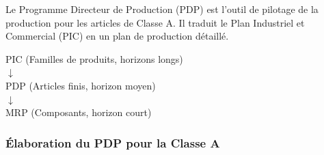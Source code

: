 \documentclass{article}
\begin{document}
Le Programme Directeur de Production (PDP) est l'outil de pilotage de la production pour les articles de Classe A. Il traduit le Plan Industriel et Commercial (PIC) en un plan de production détaillé.

\begin{tcolorbox}[colback=blue!5!white, colframe=blue!75!black, title=Articulation PIC - PDP - MRP]
\begin{center}
PIC (Familles de produits, horizons longs)\\
$\downarrow$\\
PDP (Articles finis, horizon moyen)\\
$\downarrow$\\
MRP (Composants, horizon court)
\end{center}
\end{tcolorbox}

\subsubsection{Élaboration du PDP pour la Classe A}
\end{document}
